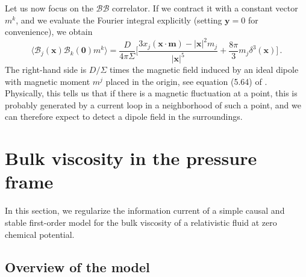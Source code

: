 \documentclass[a4paper, amsfonts, amssymb, amsmath, reprint, showkeys, nofootinbib, twoside,notitlepage,onecolumn,preprintnumbers]{revtex4-2}
\theoremstyle{definition}
\theoremstyle{theorem}
\theoremstyle{corollary}
\begin{document}
Let us now focus on the $\mathcal{B}\mathcal{B}$ correlator. If we contract it with a constant vector $m^k$, and we evaluate the Fourier integral explicitly (setting $\textbf{y}=0$ for convenience), we  obtain 
\begin{equation}
\langle\mathcal{B}_j(\textbf{x})\mathcal{B}_k(\textbf{0})m^k \rangle  = \dfrac{ D}{4\pi \Sigma} \bigg[ \dfrac{3x_j (\textbf{x}\cdot \textbf{m})  -|\textbf{x}|^2 m_j}{|\textbf{x}|^5}+ \dfrac{8\pi}{3} m_j \delta^3(\textbf{x}) \bigg] \, .
\end{equation}
The right-hand side is $D/\Sigma$ times the magnetic field induced by an ideal dipole with magnetic moment $m^j$ placed in the origin, see equation (5.64) of \cite{jackson_classical_1999}. Physically, this tells us that if there is a magnetic fluctuation at a point, this is probably generated by a current loop in a neighborhood of such a point, and we can therefore expect to detect a dipole field in the surroundings.  


\section{Bulk viscosity in the pressure frame}\label{bulkuzzo}

In this section, we regularize the information current of a simple causal and stable first-order model for the bulk viscosity of a relativistic fluid at zero chemical potential.

\subsection{Overview of the model}
\end{document}
